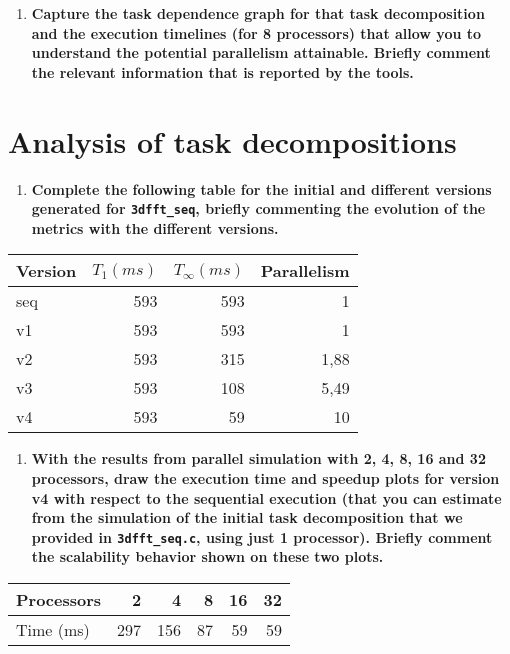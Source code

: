 \documentclass[a4paper]{article}
\begin{document}
\begin{enumerate}[resume]
	\item \textbf{Capture the task dependence graph for that task decomposition and the execution timelines (for 8 processors) that allow you to understand the potential parallelism attainable. Briefly comment the relevant information that is reported by the tools.}
\end{enumerate}

\section*{Analysis of task decompositions}

\begin{enumerate}[resume]
	\item \textbf{Complete the following table for the initial and different versions generated for \texttt{3dfft\_seq}, briefly commenting the evolution of the metrics with the different versions.}
\end{enumerate}

\begin{center}
	\begin{tabular}{l|rrr}
		Version & $T_1(ms)$ & $T_{\infty}(ms)$ & Parallelism \\
		\hline
		seq & 593 & 593 & 1 \\
		v1 & 593 & 593 & 1 \\
		v2 & 593 & 315 & 1,88 \\
		v3 & 593 & 108 & 5,49 \\
		v4 & 593 & 59 & 10
	\end{tabular}
\end{center}

\begin{enumerate}[resume]
	\item \textbf{With the results from parallel simulation with 2, 4, 8, 16 and 32 processors, draw the execution time and speedup plots for version v4 with respect to the sequential execution (that you can estimate from the simulation of the initial task decomposition that we provided in \texttt{3dfft\_seq.c}, using just 1 processor). Briefly comment the scalability behavior shown on these two plots.}
\end{enumerate}

\begin{center}
    \begin{tabular}{l|rrrrr}
        Processors & 2 & 4 & 8 & 16 & 32 \\
        \hline
        Time (ms) & 297 & 156 & 87 & 59 & 59
    \end{tabular}
\end{center}
\end{document}
